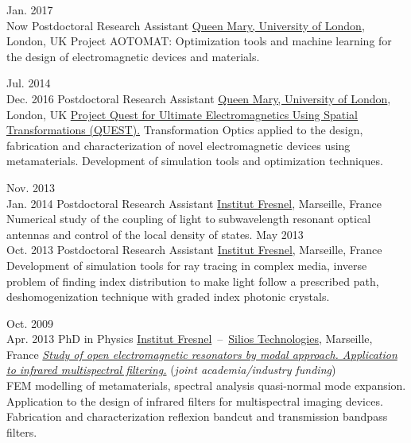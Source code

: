 \documentclass[]{cv} %
\begin{document}
\begin{entrylist}



\entry
{Jan. 2017 \\Now}
{Postdoctoral Research Assistant}
{\href{http://antennas.eecs.qmul.ac.uk/}{Queen Mary, University of London}, London, UK}
{Project AOTOMAT: Optimization tools and machine learning for the design of electromagnetic
devices and materials.
}

\entry
{Jul. 2014 \\Dec. 2016}
{Postdoctoral Research Assistant}
{\href{http://antennas.eecs.qmul.ac.uk/}{Queen Mary, University of London}, London, UK}
{\href{http://www.quest-spatial-transformation.org/}{Project Quest for Ultimate Electromagnetics Using Spatial Transformations (QUEST).}
Transformation Optics applied to the design, fabrication and characterization of novel electromagnetic devices using metamaterials.
Development of simulation tools and optimization techniques.
}


\entry
{Nov. 2013\\ Jan. 2014}
{Postdoctoral Research Assistant}
{\href{http://www.fresnel.fr/}{Institut Fresnel}, Marseille, France}
{
Numerical study of the coupling of light
to subwavelength resonant optical antennas and control of the local density of states.
}
\entry
{May 2013 \\Oct. 2013}
{Postdoctoral Research Assistant}
{\href{http://www.fresnel.fr/}{Institut Fresnel}, Marseille, France}
{
Development of simulation tools for ray tracing in complex media, inverse problem of
finding index distribution to make light follow a prescribed path, deshomogenization
technique with graded index photonic crystals.
}

\entry
{Oct. 2009\\Apr. 2013}
{PhD in Physics}
{\href{http://www.fresnel.fr/}{Institut Fresnel}~--~\href{http://www.silios.com/}{Silios Technologies}, Marseille, France}
{\emph{\href{http://tel.archives-ouvertes.fr/index.php?halsid=slas337fv1oqlj1okgkq7q42i5&view_this_doc=tel-00918651&version=1}
{Study of open electromagnetic resonators by modal approach.
Application to infrared multispectral filtering.}} (\emph{joint academia/industry funding})\\
FEM modelling of metamaterials, spectral analysis quasi-normal mode expansion.
Application to the design of infrared filters for multispectral imaging devices.
Fabrication and characterization reflexion bandcut and transmission bandpass filters.
}



\end{entrylist}
\end{document}
